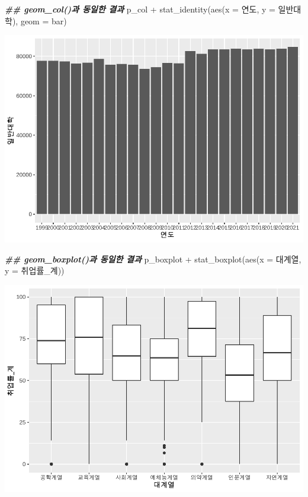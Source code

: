 \documentclass[
]{article}
\newenvironment{Shaded}{\begin{snugshade}}{\end{snugshade}}
\newcommand{\AttributeTok}[1]{\textcolor[rgb]{0.77,0.63,0.00}{#1}}
\newcommand{\DocumentationTok}[1]{\textcolor[rgb]{0.56,0.35,0.01}{\textbf{\textit{#1}}}}
\newcommand{\FunctionTok}[1]{\textcolor[rgb]{0.00,0.00,0.00}{#1}}
\newcommand{\NormalTok}[1]{#1}
\newcommand{\SpecialCharTok}[1]{\textcolor[rgb]{0.00,0.00,0.00}{#1}}
\newcommand{\StringTok}[1]{\textcolor[rgb]{0.31,0.60,0.02}{#1}}
\begin{document}
\begin{Shaded}
\begin{Highlighting}[]
\DocumentationTok{\#\# geom\_col()과 동일한 결과}
\NormalTok{p\_col }\SpecialCharTok{+}
  \FunctionTok{stat\_identity}\NormalTok{(}\FunctionTok{aes}\NormalTok{(}\AttributeTok{x =}\NormalTok{ 연도, }\AttributeTok{y =}\NormalTok{ 일반대학), }\AttributeTok{geom =} \StringTok{\textquotesingle{}bar\textquotesingle{}}\NormalTok{)}
\end{Highlighting}
\end{Shaded}

\includegraphics{chap3_files/figure-latex/unnamed-chunk-51-8.pdf}

\begin{Shaded}
\begin{Highlighting}[]
\DocumentationTok{\#\# geom\_boxplot()과 동일한 결과}
\NormalTok{p\_boxplot }\SpecialCharTok{+} 
  \FunctionTok{stat\_boxplot}\NormalTok{(}\FunctionTok{aes}\NormalTok{(}\AttributeTok{x =}\NormalTok{ 대계열, }\AttributeTok{y =}\NormalTok{ 취업률\_계)) }
\end{Highlighting}
\end{Shaded}

\includegraphics{chap3_files/figure-latex/unnamed-chunk-51-9.pdf}
\end{document}
